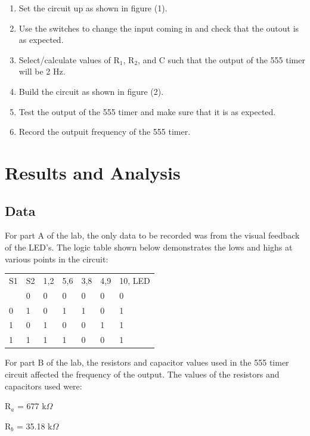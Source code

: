 \documentclass[twocolumn, amsmath]{revtex4}
\begin{document}
\begin{enumerate}
    \item Set the circuit up as shown in figure (1). 
    \item Use the switches to change the input coming in and check that the outout is as expected.
    \item Select/calculate values of R$_1$, R$_2$, and C such that the output of the 555 timer will be 2 Hz.
    \item Build the circuit as shown in figure (2).
    \item Test the output of the 555 timer and make sure that it is as expected.
    \item Record the outpuit frequency of the 555 timer.
\end{enumerate}


\section{Results and Analysis}

\subsection{Data}
For part A of the lab, the only data to be recorded was from the visual feedback of the LED's. The logic table shown below demonstrates the lows and highs at various points in the circuit:

\begin{center}
	\begin{ruledtabular}
    \begin{tabular}{ l l l l l l l}
	S1 & S2 & 1,2 & 5,6 & 3,8 & 4,9 & 10, LED \\ \colrule
	0 & 0 & 0 & 0 & 0 & 0 & 0  \\
	0 & 1 & 0 & 1 & 1 & 0 & 1 \\
	1 & 0 & 1 & 0 & 0 & 1 & 1  \\
	1 & 1 & 1 & 1 & 0 & 0 & 1 \\
\end{tabular}
    \end{ruledtabular}
\end{center}

For part B of the lab, the resistors and capacitor values used in the 555 timer circuit affected the frequency of the output. The values of the resistors and capacitors used were:

R$_a$ = 677 k$\Omega$

R$_b$ = 35.18 k$\Omega$
\end{document}
